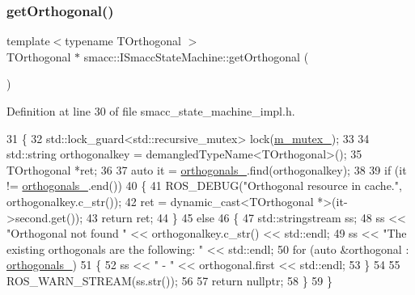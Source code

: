 \subsubsection{\texorpdfstring{get\+Orthogonal()}{getOrthogonal()}}
{\footnotesize\ttfamily template$<$typename T\+Orthogonal $>$ \\
T\+Orthogonal $\ast$ smacc\+::\+I\+Smacc\+State\+Machine\+::get\+Orthogonal (\begin{DoxyParamCaption}{ }\end{DoxyParamCaption})}



Definition at line 30 of file smacc\+\_\+state\+\_\+machine\+\_\+impl.\+h.


\begin{DoxyCode}
31   \{
32     std::lock\_guard<std::recursive\_mutex> lock(\hyperlink{classsmacc_1_1ISmaccStateMachine_aac785541646e5c517273bf31072505a1}{m\_mutex\_});
33 
34     std::string orthogonalkey = demangledTypeName<TOrthogonal>();
35     TOrthogonal *ret;
36 
37     \textcolor{keyword}{auto} it = \hyperlink{classsmacc_1_1ISmaccStateMachine_acc5944f313bc6ce1637c632243a511f2}{orthogonals\_}.find(orthogonalkey);
38 
39     \textcolor{keywordflow}{if} (it != \hyperlink{classsmacc_1_1ISmaccStateMachine_acc5944f313bc6ce1637c632243a511f2}{orthogonals\_}.end())
40     \{
41       ROS\_DEBUG(\textcolor{stringliteral}{"Orthogonal %
       resource in cache."}, orthogonalkey.c\_str());
42       ret = \textcolor{keyword}{dynamic\_cast<}TOrthogonal *\textcolor{keyword}{>}(it->second.get());
43       \textcolor{keywordflow}{return} ret;
44     \}
45     \textcolor{keywordflow}{else}
46     \{
47       std::stringstream ss;
48       ss << \textcolor{stringliteral}{"Orthogonal not found "} << orthogonalkey.c\_str() << std::endl;
49       ss << \textcolor{stringliteral}{"The existing orthogonals are the following: "} << std::endl;
50       \textcolor{keywordflow}{for} (\textcolor{keyword}{auto} &orthogonal : \hyperlink{classsmacc_1_1ISmaccStateMachine_acc5944f313bc6ce1637c632243a511f2}{orthogonals\_})
51       \{
52         ss << \textcolor{stringliteral}{" - "} << orthogonal.first << std::endl;
53       \}
54 
55       ROS\_WARN\_STREAM(ss.str());
56 
57       \textcolor{keywordflow}{return} \textcolor{keyword}{nullptr};
58     \}
59   \}
\end{DoxyCode}
\mbox{\label{classsmacc_1_1ISmaccStateMachine_a7f5b2882dbd077584767cb2533ed3c49}} 
